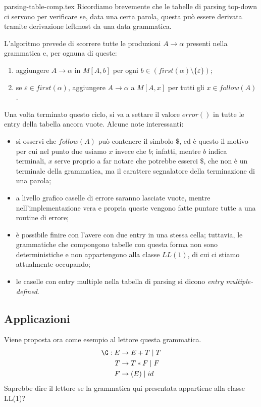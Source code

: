 \documentclass[class=book, crop=false, oneside, 12pt]{standalone}
\begin{document}
{parsing-table-comp.tex}
Ricordiamo brevemente che le tabelle di parsing top-down ci servono per verificare se, data una certa parola, questa può essere derivata tramite derivazione leftmost da una data grammatica.

L'algoritmo prevede di scorrere tutte le produzioni \(A \to \alpha\) presenti nella grammatica e, per ognuna di queste:
\begin{enumerate}
    \item aggiungere \(A \to \alpha\) in \(M[A, b]\) per ogni \(b \in (first(\alpha)\setminus \{\varepsilon\})\);
    \item se  \(\varepsilon \in first(\alpha)\), aggiungere \(A \to \alpha\) a \(M[A, x]\) per tutti gli \(x \in follow(A)\). 
\end{enumerate}
Una volta terminato questo ciclo, si va a settare il valore \(error()\) in tutte le entry della tabella ancora vuote. Alcune note interessanti:
\begin{itemize}
    \item si osservi che \(follow(A)\) può contenere il simbolo \(\$\), ed è questo il motivo per cui nel punto due usiamo \(x\) invece che \(b\); infatti, mentre \(b\) indica terminali, \(x\) serve proprio a far notare che potrebbe esserci \(\$\), che non è un terminale della grammatica, ma il carattere segnalatore della terminazione di una parola;
    \item a livello grafico caselle di errore saranno lasciate vuote, mentre nell'implementazione vera e propria queste vengono fatte puntare tutte a una routine di errore;
    \item è possibile finire con l'avere con due entry in una stessa cella; tuttavia, le grammatiche che compongono tabelle con questa forma non sono deterministiche e non appartengono alla classe \(LL(1)\), di cui ci stiamo attualmente occupando;
    \item le caselle con entry multiple nella tabella di parsing si dicono \emph{entry multiple-defined}.
\end{itemize}

\subsection{Applicazioni}
Viene proposta ora come esempio al lettore questa grammatica.
\begin{align}
    \label{non-ll1_grammar}
    \G: E &\to E+T \mid T \\
    T &\to T*F \mid F \nonumber \\ \notag
    F &\to (E) \mid id \nonumber  \notag
\end{align}
Saprebbe dire il lettore se la grammatica qui presentata appartiene alla classe LL(1)?
\end{document}
